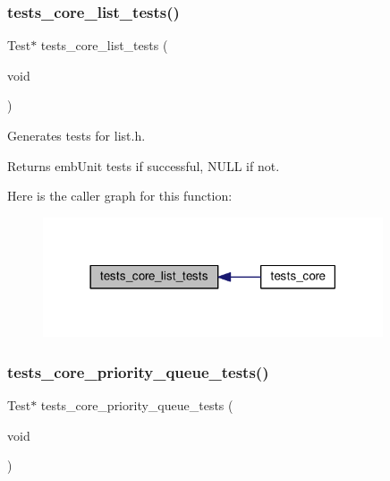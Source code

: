 \subsubsection{\texorpdfstring{tests\+\_\+core\+\_\+list\+\_\+tests()}{tests\_core\_list\_tests()}}
{\footnotesize\ttfamily Test$\ast$ tests\+\_\+core\+\_\+list\+\_\+tests (\begin{DoxyParamCaption}\item[{void}]{ }\end{DoxyParamCaption})}



Generates tests for list.\+h. 

\begin{DoxyReturn}{Returns}
emb\+Unit tests if successful, N\+U\+LL if not. 
\end{DoxyReturn}
Here is the caller graph for this function\+:
\nopagebreak
\begin{figure}[H]
\begin{center}
\leavevmode
\includegraphics[width=285pt]{group__unittests_gac59771a00b4ae805ba06afd6e93578cb_icgraph}
\end{center}
\end{figure}
\mbox{\label{group__unittests_ga5f7e66228b199fc4a8938d67b5bfbdce}} 
\subsubsection{\texorpdfstring{tests\+\_\+core\+\_\+priority\+\_\+queue\+\_\+tests()}{tests\_core\_priority\_queue\_tests()}}
{\footnotesize\ttfamily Test$\ast$ tests\+\_\+core\+\_\+priority\+\_\+queue\+\_\+tests (\begin{DoxyParamCaption}\item[{void}]{ }\end{DoxyParamCaption})}



